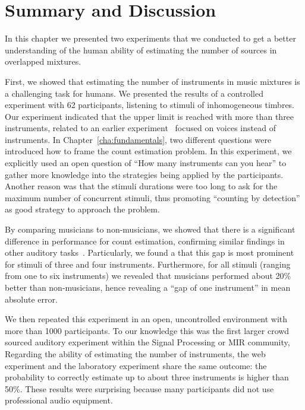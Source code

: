 \section{Summary and Discussion}


In this chapter we presented two experiments that we conducted to get a better understanding of the human ability of estimating the number of sources in overlapped mixtures.
\par
First, we showed that estimating the number of instruments in music mixtures is a challenging task for humans.
We presented the results of a controlled experiment with 62 participants, listening to stimuli of inhomogeneous timbres.
Our experiment indicated that the upper limit is reached with more than three instruments, related to an earlier experiment~\cite{huron89} focused on voices instead of instruments.
In Chapter~\ref{cha:fundamentals}, two different questions were introduced how to frame the count estimation problem.
In this experiment, we explicitly used an open question of ``How many instruments can you hear'' to gather more knowledge into the strategies being applied by the participants.
Another reason was that the stimuli durations were too long to ask for the maximum number of concurrent stimuli, thus promoting ``counting by detection'' as good strategy to approach the problem.\par
By comparing musicians to non-musicians, we showed that there is a significant difference in performance for count estimation, confirming similar findings in other auditory tasks~\cite{kishon01}.
Particularly, we found a that this gap is most prominent for stimuli of three and four instruments.
Furthermore, for all stimuli (ranging from one to six instruments) we revealed that musicians performed about 20\% better than non-musicians, hence revealing a ``gap of one instrument'' in mean absolute error.
\par
We then repeated this experiment in an open, uncontrolled environment with more than 1000 participants.
To our knowledge this was the first larger crowd sourced auditory experiment within the Signal Processing or MIR community, 
Regarding the ability of estimating the number of instruments, the web experiment and the laboratory experiment share the same outcome: the probability to correctly estimate up to about three instruments is higher than 50\%.
These results were surprising because many participants did not use professional audio equipment.
